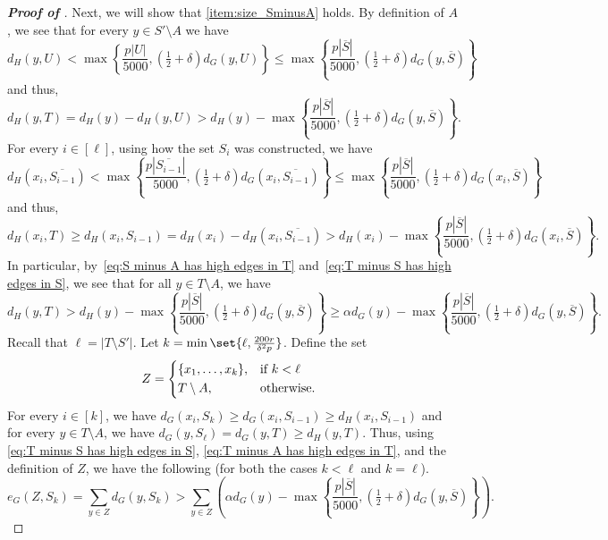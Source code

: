 \documentclass[10pt,a4paper,reqno]{amsart}
\begin{document}
\begin{proof}[\textbf{Proof of }]
Next, we will show that \ref{item:size_SminusA} holds. By definition of $A$, we see that for every $y \in S' \setminus A$ we have 
\[
d_H(y,U) < \max\left\{\frac{p|U|}{5000}, \left(\tfrac{1}{2}+\delta\right)d_G(y,U)\right\} \le \max\left\{\frac{p|\overline{S}|}{5000}, \left(\tfrac{1}{2}+\delta\right)d_G(y,\overline{S})\right\}
\]
and thus,
\begin{equation}\label{eq:S minus A has high edges in T}
d_H(y,T) = d_H(y) - d_H(y,U) > d_H(y) - \max\left\{\frac{p|\overline{S}|}{5000}, \left(\tfrac{1}{2}+\delta\right)d_G(y,\overline{S})\right\}.
\end{equation}
For every $i \in [\ell]$, using how the set $S_i$ was constructed, we have 
\[d_H(x_i,\overline{S_{i-1}}) < \max\left\{\frac{p|\overline{S_{i-1}}|}{5000}, \left(\tfrac{1}{2}+\delta\right)d_G(x_i,\overline{S_{i-1}})\right\} \le \max\left\{\frac{p|\overline{S}|}{5000}, \left(\tfrac{1}{2}+\delta\right)d_G(x_i,\overline{S})\right\}
\]
and thus,
\begin{equation}\label{eq:T minus S has high edges in S}
d_H(x_i,T) \ge d_H(x_i,S_{i-1}) = d_H(x_i) - d_H(x_i,\overline{S_{i-1}}) 
> d_H(x_i) - \max\left\{\frac{p|\overline{S}|}{5000}, \left(\tfrac{1}{2}+\delta\right)d_G(x_i,\overline{S})\right\}.
\end{equation}
In particular, by~\eqref{eq:S minus A has high edges in T} and~\eqref{eq:T minus S has high edges in S}, we see that for all $y \in T \setminus A$, we have
\begin{equation}\label{eq:T minus A has high edges in T}
d_H(y,T) > d_H(y) - \max\left\{\frac{p|\overline{S}|}{5000}, \left(\tfrac{1}{2}+\delta\right)d_G(y,\overline{S})\right\} \ge \alpha d_G(y) - \max\left\{\frac{p|\overline{S}|}{5000}, \left(\tfrac{1}{2}+\delta\right)d_G(y,\overline{S})\right\}.
\end{equation}
Recall that $\ell = |T\setminus S'|$. Let $k = \min\set{\ell,\frac{200r}{\delta^2 p}}$. Define the set 
\[
Z =
\begin{cases*} 
\{x_1,\dots,x_k\}, & if $k< \ell$
\\T\setminus A, & otherwise.
\end{cases*}
\]
For every $i\in [k]$, we have $d_G(x_i,S_k)\ge d_G(x_i,S_{i-1})\ge d_H(x_i,S_{i-1})$ and for every $y\in T\setminus A$, we have $d_G(y,S_{\ell})= d_G(y,T)\ge d_H(y,T)$. 
Thus, using \eqref{eq:T minus S has high edges in S}, \eqref{eq:T minus A has high edges in T}, and the definition of $Z$, we have the following (for both the cases $k< \ell$ and $k=\ell$).
\[
e_G(Z,S_k) = \sum_{y \in Z} d_G(y,S_k) > \sum_{y \in Z}\left(\alpha d_G(y) - \max\left\{\frac{p|\overline{S}|}{5000}, \left(\tfrac{1}{2}+\delta\right)d_G(y,\overline{S})\right\}\right).
\]
\end{proof}
\end{document}
